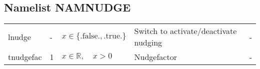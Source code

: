 \documentclass[twoside,11pt,fleqn,a4paper,english,openright]{report}
\begin{document}
\subsection{Namelist NAMNUDGE}\label{par:nudge}
\begin{center}
  \tablelasttail{
        &&&&\\\hline
  }
\begin{supertabular}{|l|p{1.6cm}|p{4cm}|p{6.5cm}|l|}
lnudge	& -		& $x\in\{\text{.false.},\text{.true.}\}$	& Switch to activate/deactivate nudging	& -\\
tnudgefac & 1	& $x \in \mathbb{R}, \quad x>0$	&	Nudgefactor & -\\
\end{supertabular}
\end{center}

\end{document}
